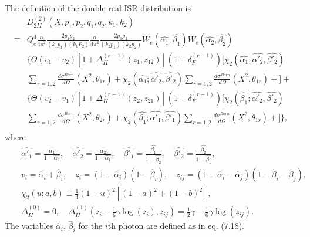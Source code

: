 The definition of the double real ISR distribution is
\begin{align}
&D_{2II}^{(2)}(X,p_1,p_2,q_1,q_2,k_1,k_2)\nonumber\\
\equiv& Q_e^4 \frac{\alpha}{4\pi^2} \frac{2p_1 p_2}{(k_1 p_1)(k_1 P_2)} \frac{\alpha}{4\pi^2}\frac{2p_1p_2}{(k_2p_1)(k_2p_2)}W_e(\hat{\alpha_1},\hat{\beta_1})W_e(\hat{\alpha_2},\hat{\beta_2})\nonumber\\
&\Biggl\{\Theta (v_1-v_2)\left[ 1+\Delta_{II}^{(r-1)} (z_1,z_{12}) \right] (1+\delta_F^{(r-1)})\Bigg[\chi_2(\hat{\alpha_1};\hat{\alpha'_2},\hat{\beta'_2})\nonumber\\
& \sum_{r=1,2}\frac{d\sigma^{Born}}{d\Omega}(X^2,\theta_{1r})+\nonumber\chi_2(\hat{\alpha_1};\hat{\alpha'_2},\hat{\beta'_2})\sum_{r=1,2}\frac{d\sigma^{Born}}{d\Omega}(X^2,\theta_{1r})+\nonumber \Bigg]+\nonumber\\
&\Biggl\{\Theta (v_2-v_1)\left[ 1+\Delta_{II}^{(r-1)} (z_2,z_{21}) \right] (1+\delta_F^{(r-1)})\Bigg[\chi_2(\hat{\beta_1};\hat{\alpha'_2},\hat{\beta'_2})\nonumber\\ &\sum_{r=1,2}\frac{d\sigma^{Born}}{d\Omega}(X^2,\theta_{2r})+\chi_2(\hat{\beta_1};\hat{\alpha'_1},\hat{\beta'_1})\sum_{r=1,2}\frac{d\sigma^{Born}}{d\Omega}(X^2,\theta_{1r})+ \Bigg] \Biggr\},\nonumber\\
\end{align}
where
\begin{eqnarray}
&&\hat{\alpha'_1}=\frac{\hat{\alpha_1}}{1-\hat{\alpha_2}},\quad \hat{\alpha'_2}=\frac{\hat{\alpha_2}}{1-\hat{\alpha_1}}, \quad
\hat{\beta'_1}=\frac{\hat{\beta_1}}{1-\hat{\beta_2}},\quad \hat{\beta'_2}=\frac{\hat{\beta_2}}{1-\hat{\beta_1}},\nonumber\\
&&v_i=\hat{\alpha}_i+\hat{\beta}_i,\quad z_i=(1-\hat{\alpha}_i)(1-\hat{\beta}_i),\quad z_{ij}=(1-\hat{\alpha}_i-\hat{\alpha}_j)(1-\hat{\beta}_i-\hat{\beta}_j),\nonumber\\
&&\chi_2(u;a,b)\equiv\frac{1}{4}(1-u)^2[(1-a)^2+(1-b)^2],\nonumber\\
&&\Delta^{(0)}_{II}=0,\quad \Delta^{(1)}_{II}(z_i-\frac{1}{6}\gamma\log(z_i),z_{ij})=\frac{1}{2}\gamma-\frac{1}{6}\gamma\log(z_{ij}).
\end{eqnarray}
The variables $\hat{\alpha}_i$, $\hat{\beta}_i$ for the $i$th photon are defined as in eq. (7.18).


